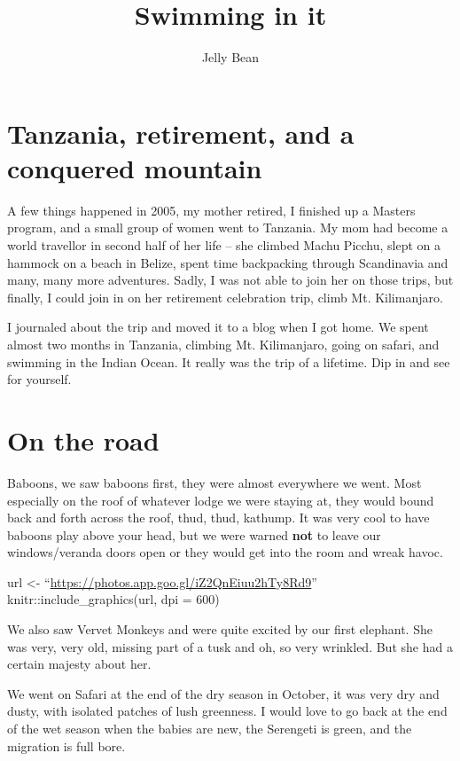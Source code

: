 \documentclass[
  openany]{book}
\title{Swimming in it}
\author{Jelly Bean}
\date{}
\begin{document}
\maketitle

{
\setcounter{tocdepth}{1}
\tableofcontents
}
\hypertarget{tanzania-retirement-and-a-conquered-mountain}{%
\chapter{Tanzania, retirement, and a conquered mountain}\label{tanzania-retirement-and-a-conquered-mountain}}

A few things happened in 2005, my mother retired, I finished up a Masters program, and a small group of women went to Tanzania. My mom had become a world travellor in second half of her life -- she climbed Machu Picchu, slept on a hammock on a beach in Belize, spent time backpacking through Scandinavia and many, many more adventures. Sadly, I was not able to join her on those trips, but finally, I could join in on her retirement celebration trip, climb Mt. Kilimanjaro.

I journaled about the trip and moved it to a blog when I got home. We spent almost two months in Tanzania, climbing Mt. Kilimanjaro, going on safari, and swimming in the Indian Ocean. It really was the trip of a lifetime. Dip in and see for yourself.

\hypertarget{on-the-road}{%
\chapter{On the road}\label{on-the-road}}

Baboons, we saw baboons first, they were almost everywhere we went. Most especially on the roof of whatever lodge we were staying at, they would bound back and forth across the roof, thud, thud, kathump. It was very cool to have baboons play above your head, but we were warned \textbf{not} to leave our windows/veranda doors open or they would get into the room and wreak havoc.

url \textless- ``\url{https://photos.app.goo.gl/iZ2QnEiuu2hTy8Rd9}''
knitr::include\_graphics(url, dpi = 600)

We also saw Vervet Monkeys and were quite excited by our first elephant. She was very, very old, missing part of a tusk and oh, so very wrinkled. But she had a certain majesty about her.

We went on Safari at the end of the dry season in October, it was very dry and dusty, with isolated patches of lush greenness. I would love to go back at the end of the wet season when the babies are new, the Serengeti is green, and the migration is full bore.
\end{document}

